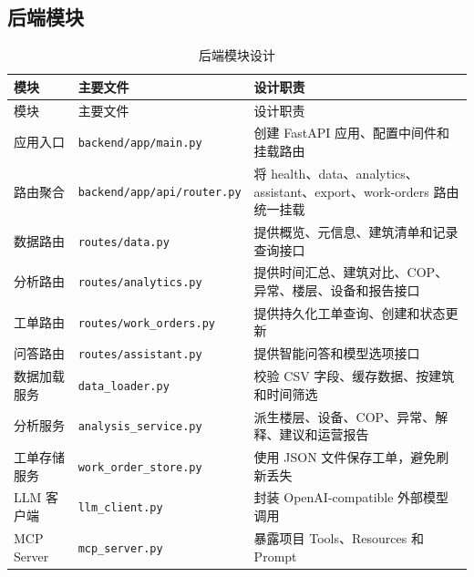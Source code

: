 \documentclass[12pt,a4paper]{ctexart}
\newcommand{\code}[1]{{\footnotesize\nolinkurl{#1}}}
\begin{document}
\subsection{后端模块}
\begin{longtable}{p{4.4cm}p{4cm}p{5.8cm}}
\caption{后端模块设计}\\
\toprule
模块 & 主要文件 & 设计职责 \\
\midrule
\endfirsthead
\toprule
模块 & 主要文件 & 设计职责 \\
\midrule
\endhead
应用入口 & \code{backend/app/main.py} & 创建 FastAPI 应用、配置中间件和挂载路由 \\
路由聚合 & \code{backend/app/api/router.py} & 将 health、data、analytics、assistant、export、work-orders 路由统一挂载 \\
数据路由 & \code{routes/data.py} & 提供概览、元信息、建筑清单和记录查询接口 \\
分析路由 & \code{routes/analytics.py} & 提供时间汇总、建筑对比、COP、异常、楼层、设备和报告接口 \\
工单路由 & \code{routes/work_orders.py} & 提供持久化工单查询、创建和状态更新 \\
问答路由 & \code{routes/assistant.py} & 提供智能问答和模型选项接口 \\
数据加载服务 & \code{data_loader.py} & 校验 CSV 字段、缓存数据、按建筑和时间筛选 \\
分析服务 & \code{analysis_service.py} & 派生楼层、设备、COP、异常、解释、建议和运营报告 \\
工单存储服务 & \code{work_order_store.py} & 使用 JSON 文件保存工单，避免刷新丢失 \\
LLM 客户端 & \code{llm_client.py} & 封装 OpenAI-compatible 外部模型调用 \\
MCP Server & \code{mcp_server.py} & 暴露项目 Tools、Resources 和 Prompt \\
\bottomrule
\end{longtable}
\end{document}

